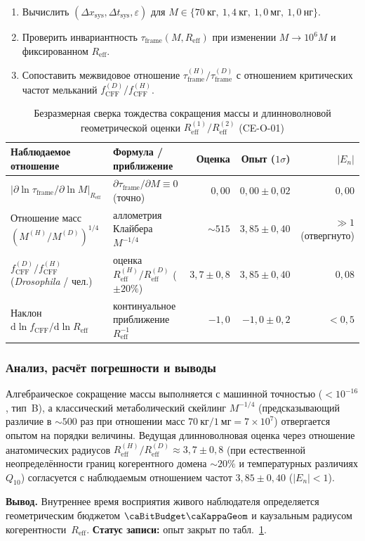 \begin{enumerate}[label=\textbf{Шаг \arabic*:},leftmargin=*,itemsep=0.35em]
\item Вычислить $(\Delta x_{\mathrm{sys}}, \Delta t_{\mathrm{sys}}, \varepsilon)$ для $M\in\{70\ \mathrm{кг},\ 1{,}4\ \mathrm{кг},\ 1{,}0\ \mathrm{мг},\ 1{,}0\ \mathrm{нг}\}$.
\item Проверить инвариантность $\tau_{\mathrm{frame}}(M, R_{\mathrm{eff}})$ при изменении $M\to 10^6 M$ и фиксированном $R_{\mathrm{eff}}$.
\item Сопоставить межвидовое отношение $\tau_{\mathrm{frame}}^{(H)}/\tau_{\mathrm{frame}}^{(D)}$ с отношением критических частот мельканий $f_{\mathrm{CFF}}^{(D)}/f_{\mathrm{CFF}}^{(H)}$.
\end{enumerate}

\begin{table}[htbp]
\centering
\footnotesize
\setlength{\tabcolsep}{3pt}
\caption{Безразмерная сверка тождества сокращения массы и длинноволновой геометрической оценки $R_{\mathrm{eff}}^{(1)}/R_{\mathrm{eff}}^{(2)}$ (CE-O-01)}
\label{tab:exp-ce-o-01}
\begin{tabular}{@{}llrrr@{}}
\toprule
Наблюдаемое отношение & Формула / приближение & Оценка & Опыт ($1\sigma$) & $|E_n|$ \\
\midrule
$|\partial\ln\tau_{\mathrm{frame}}/\partial\ln M|_{R_{\mathrm{eff}}}$ & $\partial\tau_{\mathrm{frame}}/\partial M \equiv 0$ (точно) & $0{,}00$ & $0{,}00 \pm 0{,}02$ & $0{,}00$ \\
Отношение масс $(M^{(H)}/M^{(D)})^{1/4}$ & аллометрия Клайбера $M^{-1/4}$ & $\sim 515$ & $3{,}85 \pm 0{,}40$ & $\gg 1$ (отвергнуто) \\
$f_{\mathrm{CFF}}^{(D)}/f_{\mathrm{CFF}}^{(H)}$ (\emph{Drosophila} / чел.) & оценка $R_{\mathrm{eff}}^{(H)}/R_{\mathrm{eff}}^{(D)}$ ($\pm 20\%$) & $3{,}7 \pm 0{,}8$ & $3{,}85 \pm 0{,}40$ & $0{,}08$ \\
Наклон $\mathrm{d}\ln f_{\mathrm{CFF}} / \mathrm{d}\ln R_{\mathrm{eff}}$ & континуальное приближение $R_{\mathrm{eff}}^{-1}$ & $-1{,}0$ & $-1{,}0 \pm 0{,}2$ & $< 0{,}5$ \\
\bottomrule
\end{tabular}
\end{table}

\subsubsection*{Анализ, расчёт погрешности и выводы}
Алгебраическое сокращение массы выполняется с машинной точностью ($<10^{-16}$, тип~B), а классический метаболический скейлинг $M^{-1/4}$ (предсказывающий различие в $\sim 500$ раз при отношении масс $70\ \mathrm{кг} / 1\ \mathrm{мг} = 7\times 10^7$) отвергается опытом на порядки величины.
Ведущая длинноволновая оценка через отношение анатомических радиусов $R_{\mathrm{eff}}^{(H)}/R_{\mathrm{eff}}^{(D)} \approx 3{,}7 \pm 0{,}8$ (при естественной неопределённости границ когерентного домена $\sim 20\%$ и температурных различиях $Q_{10}$) согласуется с наблюдаемым отношением частот $3{,}85 \pm 0{,}40$ ($|E_n| < 1$).

\textbf{Вывод.}
Внутреннее время восприятия живого наблюдателя определяется геометрическим бюджетом $\caBitBudget\caKappaGeom$ и каузальным радиусом когерентности~$R_{\mathrm{eff}}$.
\textbf{Статус записи:} опыт закрыт по табл.~\ref{tab:exp-ce-o-01}.
